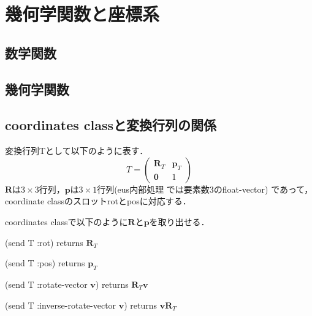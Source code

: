 \section{幾何学関数と座標系}

 \subsection{数学関数}
 

 \subsection{幾何学関数}
  

 \subsection{coordinates classと変換行列の関係}

\noindent
変換行列Tとして以下のように表す．
\[
T = \begin{pmatrix}
\mathbf{R}_T & \mathbf{p}_T \\
\mathbf{0} & 1
\end{pmatrix}
\]
$\mathbf{R}$は$3\times3$行列，$\mathbf{p}$は$3\times1$行列(eus内部処理
では要素数3のfloat-vector)
であって，
coordinate classのスロットrotとposに対応する．

\noindent
coordinates classで以下のように$\mathbf{R}$と$\mathbf{p}$を取り出せる．

\noindent
(send T :rot) returns $\mathbf{R}_T$

\noindent
(send T :pos) returns $\mathbf{p}_T$

\noindent
(send T :rotate-vector $\mathbf{v}$) returns $\mathbf{R}_T \mathbf{v}$

\noindent
(send T :inverse-rotate-vector $\mathbf{v}$) returns $\mathbf{v} \mathbf{R}_T$





